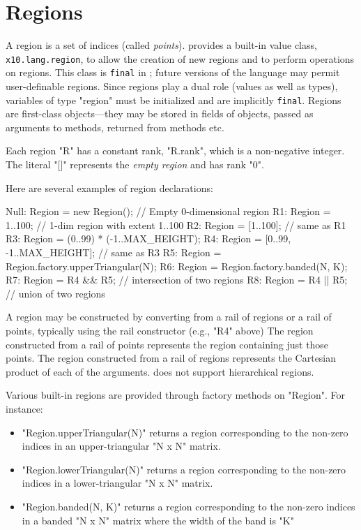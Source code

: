 \section{Regions}\label{XtenRegions}


A region is a set of indices (called {\em points}).  {}\Xten{}
provides a built-in value class, {\tt x10.lang.region}, to allow the
creation of new regions and to perform operations on regions. This
class is {\tt final} in {}\XtenCurrVer; future versions of the
language may permit user-definable regions. Since regions play a dual
role (values as well as types), variables of type \xcd"region" must be
initialized and are implicitly {\tt final}. Regions are first-class
objects---they may be stored in fields of objects, passed as
arguments to methods, returned from methods etc.

Each region \xcd"R" has a constant rank, \xcd"R.rank", which is a
non-negative integer. The literal \xcd"[]" represents the {\em empty
region} and has rank \xcd"0".

Here are several examples of region declarations:
\begin{xten}
Null: Region = new Region();  // Empty 0-dimensional region          
R1: Region = 1..100; // 1-dim region with extent 1..100
R2: Region = [1..100]; // same as R1
R3: Region = (0..99) * (-1..MAX_HEIGHT);   
R4: Region = [0..99, -1..MAX_HEIGHT]; // same as R3  
R5: Region = Region.factory.upperTriangular(N);
R6: Region = Region.factory.banded(N, K);
R7: Region = R4 && R5; // intersection of two regions
R8: Region = R4 || R5; // union of two regions
\end{xten}

A region may be constructed by converting from a rail of
regions or a rail of points, typically using the rail constructor
(e.g., \xcd"R4" above)
The region constructed from a rail of points represents the
region containing just those points.
The region constructed from a rail of regions
represents
the Cartesian product of each of the arguments.
\XtenCurrVer{} does not support hierarchical regions.


Various built-in regions are provided through  factory
methods on \xcd"Region".  For instance:
\begin{itemize}
\item \xcd"Region.upperTriangular(N)" returns a region corresponding
to the non-zero indices in an upper-triangular \xcd"N x N" matrix.
\item \xcd"Region.lowerTriangular(N)" returns a region corresponding
to the non-zero indices in a lower-triangular \xcd"N x N" matrix.
\item \xcd"Region.banded(N, K)" returns a region corresponding to
the non-zero indices in a banded \xcd"N x N" matrix where the width of
the band is \xcd"K"
\end{itemize}

